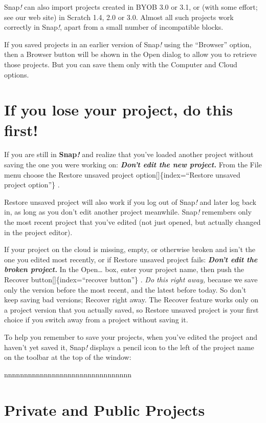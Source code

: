 \documentclass[
  letterpaper,
]{book}
\begin{document}
Snap\emph{!} can also import projects created in BYOB 3.0 or 3.1, or
(with some effort; see our web site) in Scratch 1.4, 2.0 or 3.0. Almost
all such projects work correctly in Snap\emph{!}, apart from a small
number of incompatible blocks.

If you saved projects in an earlier version of Snap\emph{!} using the
``Browser'' option, then a Browser button will be shown in the Open
dialog to allow you to retrieve those projects. But you can save them
only with the Computer and Cloud options.

\section{If you lose your project, do this
first!}\label{if-you-lose-your-project-do-this-first}

If you are still in \textbf{Snap\emph{!}} and realize that you've loaded
another project without saving the one you were working on:
\textbf{\emph{Don't edit the new project.}} From the File menu choose
the Restore unsaved project option{[}{]}\{index=``Restore unsaved
project option''\} .

Restore unsaved project will also work if you log out of Snap\emph{!}
and later log back in, as long as you don't edit another project
meanwhile. Snap\emph{!} remembers only the most recent project that
you've edited (not just opened, but actually changed in the project
editor).

If your project on the cloud is missing, empty, or otherwise broken and
isn't the one you edited most recently, or if Restore unsaved project
fails: \textbf{\emph{Don't edit the broken project.}} In the
Open\ldots{} box, enter your project name, then push the Recover
button{[}{]}\{index=``recover button''\} . \emph{Do this right away,}
because we save only the version before the most recent, and the latest
before today. So don't keep saving bad versions; Recover right away. The
Recover feature works only on a project version that you actually saved,
so Restore unsaved project is your first choice if you switch away from
a project without saving it.

To help you remember to save your projects, when you've edited the
project and haven't yet saved it, Snap\emph{!} displays a pencil icon to
the left of the project name on the toolbar at the top of the window:

nnnnnnnnnnnnnnnnnnnnnnnnnnnnnnnn

\section{Private and Public Projects}\label{private-and-public-projects}
\end{document}
